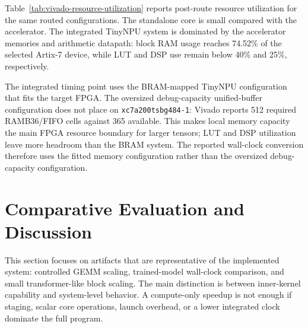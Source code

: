 \documentclass[a4paper, 12pt, titlepage]{article}
\begin{document}
Table~\ref{tab:vivado-resource-utilization} reports post-route resource utilization for the same routed configurations. The standalone core is small compared with the accelerator. The integrated TinyNPU system is dominated by the accelerator memories and arithmetic datapath: block RAM usage reaches 74.52\% of the selected Artix-7 device, while LUT and DSP use remain below 40\% and 25\%, respectively.

\begin{table}[H]
    \centering
    \footnotesize
    \caption{Vivado post-route resource utilization for the timing configurations in Table~\ref{tab:vivado-timing}. Target device is \texttt{xc7a200tsbg484-1}.}
    \label{tab:vivado-resource-utilization}
\end{table}

The integrated timing point uses the BRAM-mapped TinyNPU configuration that fits the target FPGA. The oversized debug-capacity unified-buffer configuration does not place on \texttt{xc7a200tsbg484-1}: Vivado reports 512 required RAMB36/FIFO cells against 365 available. This makes local memory capacity the main FPGA resource boundary for larger tensors; LUT and DSP utilization leave more headroom than the BRAM system. The reported wall-clock conversion therefore uses the fitted memory configuration rather than the oversized debug-capacity configuration.

\newpage
\section{Comparative Evaluation and Discussion}
This section focuses on artifacts that are representative of the implemented system: controlled GEMM scaling, trained-model wall-clock comparison, and small transformer-like block scaling. The main distinction is between inner-kernel capability and system-level behavior. A compute-only speedup is not enough if staging, scalar core operations, launch overhead, or a lower integrated clock dominate the full program.
\end{document}
